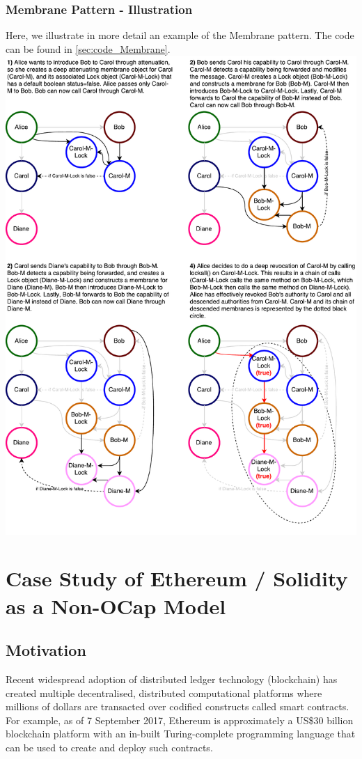 \documentclass[a4paper,11pt,twoside]{article}
\begin{document}
{\begin{minipage}{\textwidth}
\subsubsection{Membrane Pattern - Illustration}\label{sec:figmem}
\small Here, we illustrate in more detail an example of the Membrane pattern. The code can be found in \cref{sec:code_Membrane}.\\
\includegraphics[width=1.05\textwidth]{figures/Membrane.pdf}
   \label{fig:figmem}
\end{minipage}
\section{Case Study of Ethereum / Solidity as a Non-OCap Model}\label{sec:ethereum}

\subsection{Motivation}
Recent widespread adoption of distributed ledger technology (blockchain) has created multiple decentralised, distributed computational platforms where millions of dollars are transacted over codified constructs called smart contracts. For example, as of 7 September 2017, Ethereum\cite{wood2014} is approximately a US\$30 billion blockchain platform with an in-built Turing-complete programming language that can be used to create and deploy such contracts.

}
\end{document}
